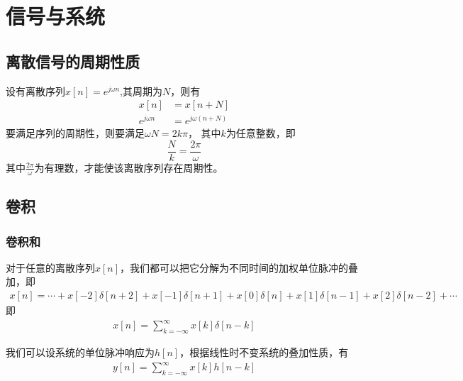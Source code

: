 \chapter{信号与系统}

\section{离散信号的周期性质}

设有离散序列$x[n] = e^{j\omega n}$,其周期为$N$，则有
\[
    \begin{aligned}
        x[n] &= x[n+N] \\
        e^{j\omega n} &= e^{j\omega (n+N)}
    \end{aligned}
\]
要满足序列的周期性，则要满足$\omega N = 2k\pi$，
其中$k$为任意整数，即
\begin{equation}
    \frac{N}{k} = \frac{2\pi}{\omega}
    \label{eqa:离散信号的周期性质结论}
\end{equation}
其中$\frac{2\pi}{\omega}$为有理数，才能使该离散序列存在周期性。

\section{卷积}

\subsection{卷积和}

对于任意的离散序列$x[n]$，我们都可以把它分解为不同时间的加权单位脉冲的叠加，即
\begin{equation}
    \begin{aligned}
        x[n] = \cdots +x[-2]\delta[n+2]+x[-1]\delta[n+1]+x[0]\delta[n]
            +x[1]\delta[n-1]+x[2]\delta[n-2]+\cdots
    \end{aligned}
    \label{eqa:卷积和1}
\end{equation}
即
\begin{equation}
    \begin{aligned}
        x[n] = \sum_{k=-\infty}^{\infty}x[k]\delta[n-k]
    \end{aligned}
    \label{eqa:卷积和2}
\end{equation}

我们可以设系统的单位脉冲响应为$h[n]$，根据线性时不变系统的叠加性质，有
\begin{equation}
    \begin{aligned}
        y[n] = \sum_{k=-\infty}^{\infty}x[k]h[n-k]
    \end{aligned}
    \label{eqa:卷积和公式}
\end{equation}


